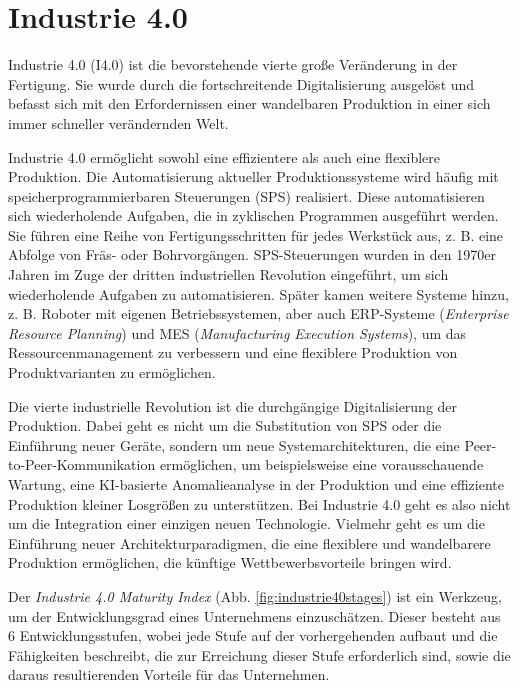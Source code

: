 \section{Industrie 4.0}

Industrie 4.0 (I4.0) ist die bevorstehende vierte große Veränderung in der Fertigung. Sie wurde durch die fortschreitende Digitalisierung ausgelöst und befasst sich mit den Erfordernissen einer wandelbaren Produktion in einer sich immer schneller verändernden Welt. 

Industrie 4.0 ermöglicht sowohl eine effizientere als auch eine flexiblere Produktion. Die Automatisierung aktueller Produktionssysteme wird häufig mit speicherprogrammierbaren Steuerungen (SPS) realisiert. Diese automatisieren sich wiederholende Aufgaben, die in zyklischen Programmen ausgeführt werden. Sie führen eine Reihe von Fertigungsschritten für jedes Werkstück aus, z. B. eine Abfolge von Fräs- oder Bohrvorgängen. SPS-Steuerungen wurden in den 1970er Jahren im Zuge der dritten industriellen Revolution eingeführt, um sich wiederholende Aufgaben zu automatisieren. Später kamen weitere Systeme hinzu, z. B. Roboter mit eigenen Betriebssystemen, aber auch ERP-Systeme (\emph{Enterprise Resource Planning}) und MES (\emph{Manufacturing Execution Systems}), um das Ressourcenmanagement zu verbessern und eine flexiblere Produktion von Produktvarianten zu ermöglichen. \cite{kuhnServiceBasedArchitecturesProduction2020}

Die vierte industrielle Revolution ist die durchgängige Digitalisierung der Produktion. Dabei geht es nicht um die Substitution von SPS oder die Einführung neuer Geräte, sondern um neue Systemarchitekturen, die eine Peer-to-Peer-Kommunikation ermöglichen, um beispielsweise eine vorausschauende Wartung, eine KI-basierte Anomalieanalyse in der Produktion und eine effiziente Produktion kleiner Losgrößen zu unterstützen. Bei Industrie 4.0 geht es also nicht um die Integration einer einzigen neuen Technologie. Vielmehr geht es um die Einführung neuer Architekturparadigmen, die eine flexiblere und wandelbarere Produktion ermöglichen, die künftige Wettbewerbsvorteile bringen wird. \cite{kuhnServiceBasedArchitecturesProduction2020}


Der \emph{Industrie 4.0 Maturity Index} (Abb. \ref{fig:industrie40stages}) ist ein Werkzeug, um der Entwicklungsgrad eines Unternehmens einzuschätzen. Dieser besteht aus 6 Entwicklungsstufen, wobei jede Stufe auf der vorhergehenden aufbaut und die Fähigkeiten beschreibt, die zur Erreichung dieser Stufe erforderlich sind, sowie die daraus resultierenden Vorteile für das Unternehmen. \cite{schuhIndustrieMaturityIndex}

